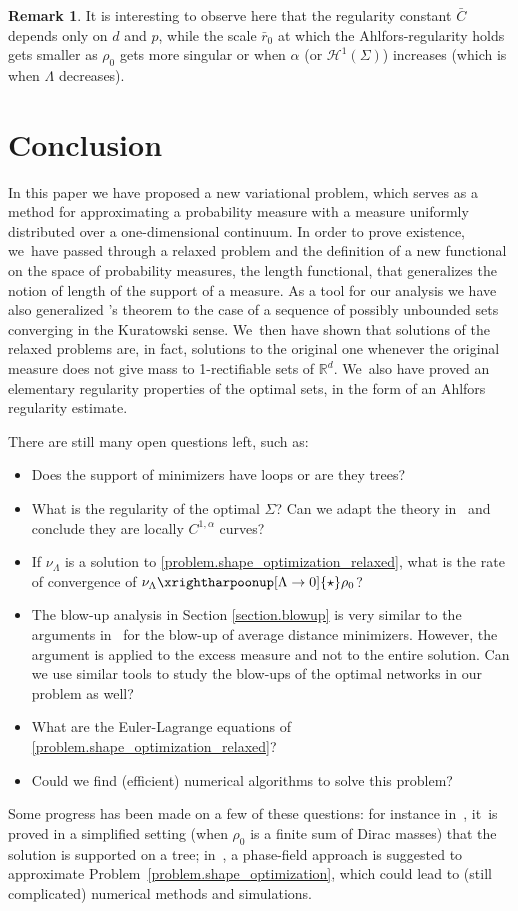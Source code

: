 \documentclass[10pt]{amsart}
\theoremstyle{definition}
\newtheorem{remark}[theorem]{Remark}
\newcommand\cH{\mathcal{H}}
\newcommand{\RR}{\mathbb{R}}
\begin{document}
\begin{remark} It is interesting to observe here that the regularity constant
$\bar C$ depends only on $d$ and $p$, while the scale $\bar r_0$ at which the Ahlfors-regularity
holds gets smaller as $\rho_0$ gets more singular or when $\alpha$ (or $\cH^1(\Sigma)$) increases (which is when $\Lambda$ decreases).
\end{remark}

\section{Conclusion}\label{section.conclusion}
In this paper we have proposed a new variational problem, which serves as a method for approximating a probability measure with a measure uniformly distributed over a one-dimensional continuum.
In order to prove existence, we~have passed through a relaxed problem and the definition of a new functional on the space of probability measures, the length functional, that generalizes the notion of length of the support of a measure. As a tool for our analysis we have also generalized \Golab's theorem to the case of a sequence of possibly unbounded sets converging in the Kuratowski sense. We~then have shown that solutions of the relaxed
problems are, in fact, solutions to the original one whenever the original measure does not give mass to 1-rectifiable sets of $\RR^d$. We~also have proved an elementary regularity properties of the
optimal sets, in the form of an Ahlfors regularity estimate.

There are still many open questions left, such as:
\begin{itemize}
\item Does the support of minimizers have loops or are they trees?
\item What is the regularity of the optimal $\Sigma$? Can we adapt the theory in~\cite{morgan1994m} and conclude they are locally $C^{1,\alpha}$ curves?
\item If $\nu_\Lambda$ is a solution to \eqref{problem.shape_optimization_relaxed}, what is the rate of convergence of $\nu_\Lambda \xrightharpoonup[\Lambda \to 0]{\star} \rho_0$?
\item The blow-up analysis in Section \ref{section.blowup} is very similar to the arguments in~\cite{santambrogio2005blow} for the blow-up of average distance minimizers. However, the argument is applied to the excess measure and not to the entire solution. Can we use similar tools to study the blow-ups of the optimal networks in our problem as well?
\item What are the Euler-Lagrange equations of \eqref{problem.shape_optimization_relaxed}?
\item Could we find (efficient) numerical algorithms to solve this problem?
\end{itemize}
Some progress has been made on a few of these questions: for instance in~\cite{MachadoThesis},
it~is proved in a simplified setting (when $\rho_0$ is a finite sum
of Dirac masses) that the solution is supported on a tree; in~\cite{MachadoPhaseField},
a phase-field approach is suggested to approximate Problem~\eqref{problem.shape_optimization}, which could
lead to (still complicated) numerical methods and simulations.
\end{document}
